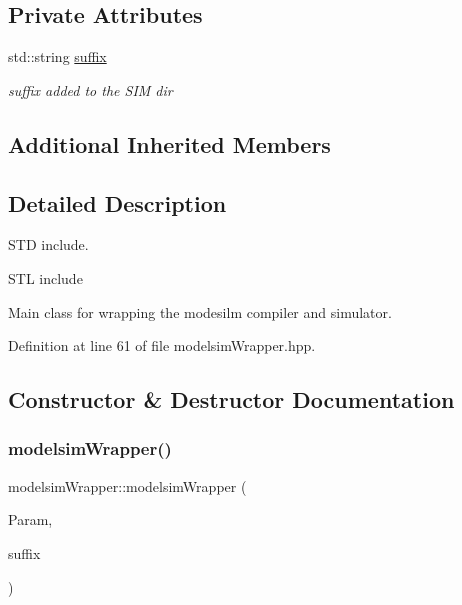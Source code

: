 \subsection*{Private Attributes}
\begin{DoxyCompactItemize}
\item 
std\+::string \hyperlink{classmodelsimWrapper_a1e6782025a8c2dea2fc3dc42943e1755}{suffix}
\begin{DoxyCompactList}\small\item\em suffix added to the S\+IM dir \end{DoxyCompactList}\end{DoxyCompactItemize}
\subsection*{Additional Inherited Members}


\subsection{Detailed Description}
S\+TD include. 

S\+TL include

Main class for wrapping the modesilm compiler and simulator. 

Definition at line 61 of file modelsim\+Wrapper.\+hpp.



\subsection{Constructor \& Destructor Documentation}
\mbox{\label{classmodelsimWrapper_aa5ea5e63c543de87a906a0a306967388}} 
\subsubsection{\texorpdfstring{modelsim\+Wrapper()}{modelsimWrapper()}}
{\footnotesize\ttfamily modelsim\+Wrapper\+::modelsim\+Wrapper (\begin{DoxyParamCaption}\item[{const \hyperlink{Parameter_8hpp_a37841774a6fcb479b597fdf8955eb4ea}{Parameter\+Const\+Ref} \&}]{Param,  }\item[{std\+::string}]{suffix }\end{DoxyParamCaption})}



